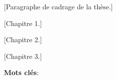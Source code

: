 
[Paragraphe de cadrage de la thèse.]

[Chapitre 1.]

[Chapitre 2.]

[Chapitre 3.]

\vspace{0.5cm}
\noindent\textbf{Mots clés}: %
\\
